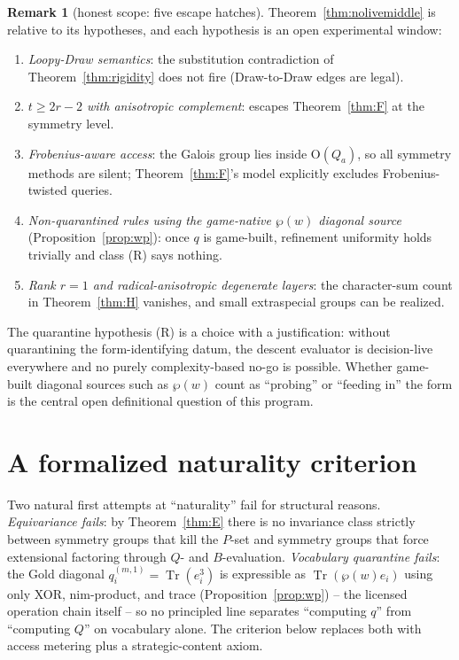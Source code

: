 \documentclass[11pt]{article}
\theoremstyle{plain}
\theoremstyle{definition}
\newtheorem{remark}{Remark}
\newcommand{\Tr}{\operatorname{Tr}}
\newcommand{\Orth}{\mathrm{O}}
\begin{document}
\begin{remark}[honest scope: five escape hatches]\label{rem:hatches}
Theorem~\ref{thm:nolivemiddle} is relative to its hypotheses, and each
hypothesis is an open experimental window:
\begin{enumerate}[leftmargin=*,itemsep=0pt]
\item \emph{Loopy-Draw semantics}: the substitution contradiction of
Theorem~\ref{thm:rigidity} does not fire (Draw-to-Draw edges are legal).
\item \emph{$t\geq 2r-2$ with anisotropic complement}: escapes
Theorem~\ref{thm:F} at the symmetry level.
\item \emph{Frobenius-aware access}: the Galois group lies inside
$\Orth(Q_a)$, so all symmetry methods are silent;
Theorem~\ref{thm:F}'s model explicitly excludes Frobenius-twisted queries.
\item \emph{Non-quarantined rules using the game-native $\wp(w)$ diagonal
source} (Proposition~\ref{prop:wp}): once $q$ is game-built, refinement
uniformity holds trivially and class (R) says nothing.
\item \emph{Rank $r=1$ and radical-anisotropic degenerate layers}: the
character-sum count in Theorem~\ref{thm:H} vanishes, and small extraspecial
groups can be realized.
\end{enumerate}
The quarantine hypothesis (R) is a choice with a justification: without
quarantining the form-identifying datum, the descent evaluator is
decision-live everywhere and no purely complexity-based no-go is possible.
Whether game-built diagonal sources such as $\wp(w)$ count as ``probing''
or ``feeding in'' the form is the central open definitional question of
this program.
\end{remark}

\section{A formalized naturality criterion}\label{sec:criterion}

Two natural first attempts at ``naturality'' fail for structural reasons.
\emph{Equivariance fails}: by Theorem~\ref{thm:E} there is no invariance
class strictly between symmetry groups that kill the $P$-set and symmetry
groups that force extensional factoring through $Q$- and $B$-evaluation.
\emph{Vocabulary quarantine fails}: the Gold diagonal
$q_i^{(m,1)}=\Tr(e_i^3)$ is expressible as $\Tr(\wp(w)e_i)$ using only XOR,
nim-product, and trace (Proposition~\ref{prop:wp}) -- the licensed operation
chain itself -- so no principled line separates ``computing $q$'' from
``computing $Q$'' on vocabulary alone. The criterion below replaces both
with access metering plus a strategic-content axiom.
\end{document}
